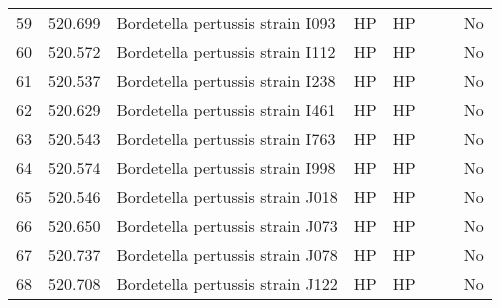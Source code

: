 \begin{tabular}{llllllll}
59  &     520.699 &                                  Bordetella pertussis strain I093 &            HP &              HP &                                       \cite{bowden2016genome} &                                  &            No \\
60  &     520.572 &                                  Bordetella pertussis strain I112 &            HP &              HP &                                       \cite{bowden2016genome} &                                  &            No \\
61  &     520.537 &                                  Bordetella pertussis strain I238 &            HP &              HP &                                       \cite{bowden2016genome} &                                  &            No \\
62  &     520.629 &                                  Bordetella pertussis strain I461 &            HP &              HP &                                       \cite{bowden2016genome} &                                  &            No \\
63  &     520.543 &                                  Bordetella pertussis strain I763 &            HP &              HP &                                       \cite{bowden2016genome} &                                  &            No \\
64  &     520.574 &                                  Bordetella pertussis strain I998 &            HP &              HP &                                       \cite{bowden2016genome} &                                  &            No \\
65  &     520.546 &                                  Bordetella pertussis strain J018 &            HP &              HP &                                       \cite{bowden2016genome} &                                  &            No \\
66  &     520.650 &                                  Bordetella pertussis strain J073 &            HP &              HP &                                       \cite{bowden2016genome} &                                  &            No \\
67  &     520.737 &                                  Bordetella pertussis strain J078 &            HP &              HP &                                       \cite{bowden2016genome} &                                  &            No \\
68  &     520.708 &                                  Bordetella pertussis strain J122 &            HP &              HP &                                       \cite{bowden2016genome} &                                  &            No \\

\end{tabular}
